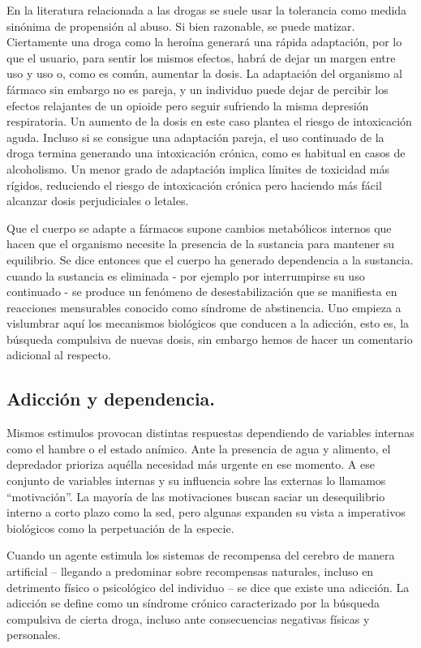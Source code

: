 En la literatura relacionada a las drogas se suele usar la tolerancia como medida sinónima de propensión al abuso. Si bien razonable, se puede matizar. Ciertamente una droga como la heroína generará una rápida adaptación, por lo que el usuario, para sentir los mismos efectos, habrá de dejar un margen entre uso y uso o, como es común, aumentar la dosis. La adaptación del organismo al fármaco sin embargo no es pareja, y un individuo puede dejar de percibir los efectos relajantes de un opioide pero seguir sufriendo la misma depresión respiratoria. Un aumento de la dosis en este caso plantea el riesgo de intoxicación aguda. Incluso si se consigue una adaptación pareja, el uso continuado de la droga termina generando una intoxicación crónica, como es habitual en casos de alcoholismo. Un menor grado de adaptación implica límites de toxicidad más rígidos, reduciendo el riesgo de intoxicación crónica pero haciendo más fácil alcanzar dosis perjudiciales o letales.

Que el cuerpo se adapte a fármacos supone cambios metabólicos internos que hacen que el organismo necesite la presencia de la sustancia para mantener su equilibrio. Se dice entonces que el cuerpo ha generado dependencia a la sustancia. cuando la sustancia es eliminada - por ejemplo por interrumpirse su uso continuado - se produce un fenómeno de desestabilización que se manifiesta en reacciones mensurables conocido como síndrome de abstinencia. Uno empieza a vislumbrar aquí los mecanismos biológicos que conducen a la adicción, esto es, la búsqueda compulsiva de nuevas dosis, sin embargo hemos de hacer un comentario adicional al respecto.

\newpage

\subsection{Adicción y dependencia.}

Mismos estimulos provocan distintas respuestas dependiendo de variables internas como el hambre o el estado anímico. Ante la presencia de agua y alimento, el depredador prioriza aquélla necesidad más urgente en ese momento. A ese conjunto de variables internas y su influencia sobre las externas lo llamamos \enquote{motivación}. La mayoría de las motivaciones buscan saciar un desequilibrio interno a corto plazo como la sed, pero algunas expanden su vista a imperativos biológicos como la perpetuación de la especie.

Cuando un agente estimula los sistemas de recompensa del cerebro de manera artificial – llegando a predominar sobre recompensas naturales, incluso en detrimento físico o psicológico del individuo – se dice que existe una adicción. La adicción se define como un síndrome crónico caracterizado por la búsqueda compulsiva de cierta droga, incluso ante consecuencias negativas físicas y personales.

